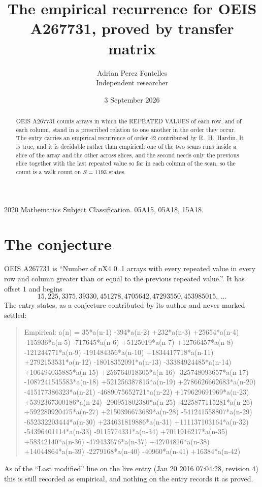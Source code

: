 \documentclass[11pt,a4paper]{article}
\title{The empirical recurrence for OEIS A267731, proved by transfer matrix}
\author{Adrian Perez Fontelles\\ \small Independent researcher}
\date{3 September 2026}
\theoremstyle{plain}
\theoremstyle{definition}
\begin{document}
\maketitle

\begin{abstract}
OEIS A267731 counts arrays in which the REPEATED VALUES of each row, and of each column, stand in a
prescribed relation to one another in the order they occur. The entry carries an empirical
recurrence of order $42$ contributed by R.~H.~Hardin. It is true, and it is decidable
rather than empirical: one of the two scans runs inside a slice of the array and the other
across slices, and the second needs only the previous slice together with the last repeated
value so far in each column of the scan, so the count is a walk count on $S=1193$ states.
\end{abstract}

\noindent\small 2020 Mathematics Subject Classification. 05A15, 05A18, 15A18.\normalsize

\section{The conjecture}

OEIS A267731 is ``Number of nX4 0..1 arrays with every repeated value in every row and column greater than or equal to the previous repeated value.''. It has offset $1$ and begins
\[
15, 225, 3375, 39330, 451278, 4705642, 47293550, 453985015,\ \dots
\]
The entry states, as a conjecture contributed by its author and never marked settled:
\begin{quote}
Empirical: a(n) = 35*a(n-1) -394*a(n-2) +232*a(n-3) +25654*a(n-4) -115936*a(n-5) -717645*a(n-6) +5125019*a(n-7) +12766457*a(n-8) -121244771*a(n-9) -191484356*a(n-10) +1834417718*a(n-11) +2792153531*a(n-12) -18018352091*a(n-13) -33384924485*a(n-14) +106494035885*a(n-15) +256764018305*a(n-16) -325748093657*a(n-17) -1087241545583*a(n-18) +521256387815*a(n-19) +2786626662683*a(n-20) -415177386323*a(n-21) -4689075652721*a(n-22) +179629691969*a(n-23) +5392367300186*a(n-24) -290951802380*a(n-25) -4225877115281*a(n-26) +592280920475*a(n-27) +2150396673689*a(n-28) -541241558807*a(n-29) -652332203444*a(n-30) +234631819886*a(n-31) +111137103164*a(n-32) -54396401114*a(n-33) -9115774331*a(n-34) +7011916217*a(n-35) +58342140*a(n-36) -479433676*a(n-37) +42704816*a(n-38) +14044864*a(n-39) -2279168*a(n-40) -40960*a(n-41) +16384*a(n-42)
\end{quote}
As of the ``Last modified'' line on the live entry (Jan 20 2016 07:04:28, revision 4) this is still
recorded as empirical, and nothing on the entry records it as proved.
\end{document}

